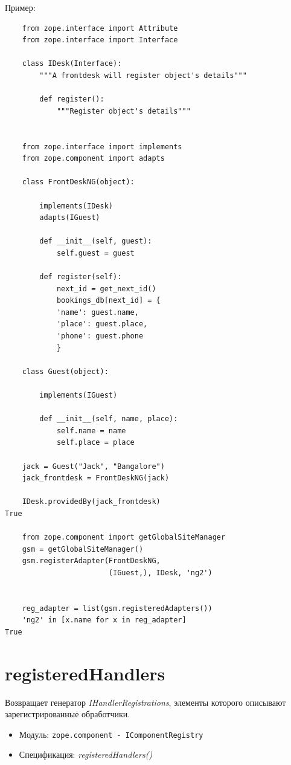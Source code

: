 \documentclass[a4paper,openany,twoside,draft]{book}
\providecommand*{\DUroletitlereference}[1]{\textsl{#1}}
\begin{document}
Пример:

\begin{verbatim}
    from zope.interface import Attribute
    from zope.interface import Interface

    class IDesk(Interface):
        """A frontdesk will register object's details"""

        def register():
            """Register object's details"""


    from zope.interface import implements
    from zope.component import adapts

    class FrontDeskNG(object):

        implements(IDesk)
        adapts(IGuest)

        def __init__(self, guest):
            self.guest = guest

        def register(self):
            next_id = get_next_id()
            bookings_db[next_id] = {
            'name': guest.name,
            'place': guest.place,
            'phone': guest.phone
            }

    class Guest(object):

        implements(IGuest)

        def __init__(self, name, place):
            self.name = name
            self.place = place

    jack = Guest("Jack", "Bangalore")
    jack_frontdesk = FrontDeskNG(jack)

    IDesk.providedBy(jack_frontdesk)
True

    from zope.component import getGlobalSiteManager
    gsm = getGlobalSiteManager()
    gsm.registerAdapter(FrontDeskNG,
                        (IGuest,), IDesk, 'ng2')


    reg_adapter = list(gsm.registeredAdapters())
    'ng2' in [x.name for x in reg_adapter]
True
\end{verbatim}


\section*{registeredHandlers%
  \label{registeredhandlers}%
}

Возвращает генератор \DUroletitlereference{IHandlerRegistrations}, элементы которого описывают зарегистрированные обработчики.

\begin{itemize}

\item Модуль: \texttt{zope.component - IComponentRegistry}

\item Спецификация: \DUroletitlereference{registeredHandlers()}

\end{itemize}
\end{document}
